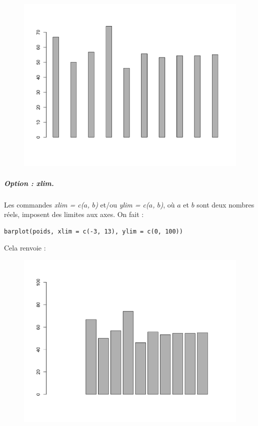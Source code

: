 \begin{figure}[H]\begin{center}\includegraphics[scale=0.4]{ilu/gra34.png}\end{center}\end{figure}

\subparagraph{Option : xlim.} 
Les commandes \textit{xlim = c($a$, $b$)} et/ou \textit{ylim = c($a$, $b$)}, où $a$ et $b$ sont deux nombres réels, imposent des limites aux axes.\newline
On fait :
\begin{lstlisting}[language=html]
barplot(poids, xlim = c(-3, 13), ylim = c(0, 100))
\end{lstlisting}
Cela renvoie :
\begin{figure}[H]\begin{center}\includegraphics[scale=0.4]{ilu/gra35.png}\end{center}\end{figure}

